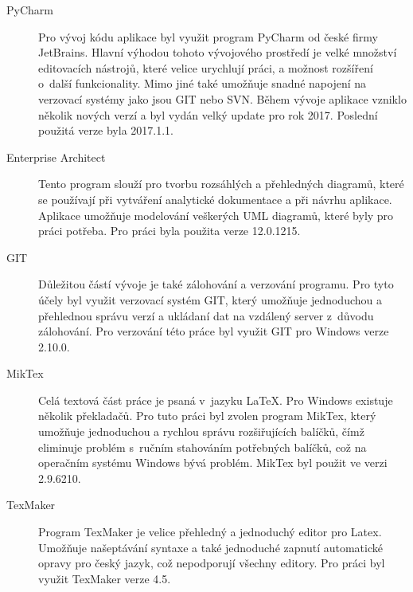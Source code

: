 \documentclass[thesis=B,czech]{resources/FITthesis}[2012/06/26]
\begin{document}
\begin{description}
\item[PyCharm] Pro vývoj kódu aplikace byl využit program PyCharm od české firmy JetBrains. Hlavní výhodou tohoto vývojového prostředí je velké množství editovacích nástrojů, které velice urychlují práci, a možnost rozšíření o~další funkcionality. Mimo jiné také umožňuje snadné napojení na verzovací systémy jako jsou GIT nebo SVN. Během vývoje aplikace vzniklo několik nových verzí a byl vydán velký update pro rok 2017. Poslední použitá verze byla 2017.1.1.

\item[Enterprise Architect] Tento program slouží pro tvorbu rozsáhlých a přehledných diagramů, které se používají při vytváření analytické dokumentace a při návrhu aplikace. Aplikace umožňuje modelování veškerých UML diagramů, které byly pro práci potřeba. Pro práci byla použita verze 12.0.1215.

\item[GIT] Důležitou částí vývoje je také zálohování a verzování programu. Pro tyto účely byl využit verzovací systém GIT, který umožňuje jednoduchou a přehlednou správu verzí a ukládaní dat na vzdálený server z~důvodu zálohování. Pro verzování této práce byl využit GIT pro Windows verze 2.10.0.

\item[MikTex] Celá textová část práce je psaná v~jazyku \LaTeX. Pro Windows existuje několik překladačů. Pro tuto práci byl zvolen program MikTex, který umožňuje jednoduchou a rychlou správu rozšiřujících balíčků, čímž eliminuje problém s~ručním stahováním potřebných balíčků, což na operačním systému Windows bývá problém. MikTex byl použit ve verzi 2.9.6210.

\item[TexMaker] Program TexMaker je velice přehledný a jednoduchý editor pro Latex. Umožňuje našeptávání syntaxe a také jednoduché zapnutí automatické opravy pro český jazyk, což nepodporují všechny editory. Pro práci byl využit TexMaker verze 4.5.
\end{description}
\end{document}
